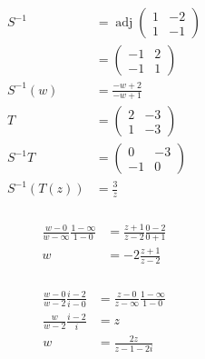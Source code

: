 \documentclass{article}
\newcommand{\adj}{\operatorname{adj}}
\begin{document}
\begin{align*}
  S^{-1}       & = \adj \begin{pmatrix}
                          1 & -2 \\
                          1 & -1
                        \end{pmatrix}   \\
               & = \begin{pmatrix}
                     -1 & 2 \\
                     -1 & 1
                   \end{pmatrix}        \\
  S^{-1}(w)    & = \frac{-w + 2}{-w + 1} \\
  T            & = \begin{pmatrix}
                     2 & -3 \\
                     1 & -3
                   \end{pmatrix}        \\
  S^{-1} T     & = \begin{pmatrix}
                     0  & -3 \\
                     -1 & 0
                   \end{pmatrix}        \\
  S^{-1}(T(z)) & = \frac{3}{z}
\end{align*}

\setcounter{subsubsection}{8}
\subsubsection{}

\begin{align*}
  \frac{w - 0}{w - \infty} \frac{1 - \infty}{1 - 0} & = \frac{z + 1}{z - 2} \frac{0 - 2}{0 + 1} \\
  w                                                 & = -2 \frac{z + 1}{z - 2}
\end{align*}

\setcounter{subsubsection}{10}
\subsubsection{}

\begin{align*}
  \frac{w - 0}{w - 2} \frac{i - 2}{i - 0} & = \frac{z - 0}{z - \infty} \frac{1 - \infty}{1 - 0} \\
  \frac{w}{w - 2} \frac{i - 2}{i}         & = z                                                 \\
  w                                       & = \frac{2 z}{z - 1 - 2 i}
\end{align*}
\end{document}
